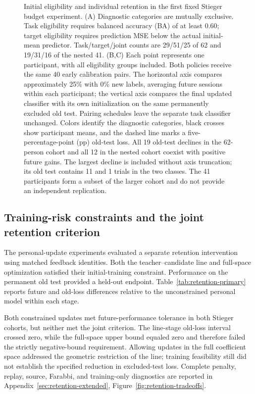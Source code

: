 \documentclass[11pt,a4paper]{article}
\begin{document}
\begin{figure}[t]
\begin{tikzpicture}[font=\scriptsize]
\end{tikzpicture}
\endgroup
\caption{Initial eligibility and individual retention in the first fixed Stieger budget experiment. (A) Diagnostic categories are mutually exclusive. Task eligibility requires balanced accuracy (BA) of at least 0.60; target eligibility requires prediction MSE below the actual initial-mean predictor. Task/target/joint counts are 29/51/25 of 62 and 19/31/16 of the nested 41. (B,C) Each point represents one participant, with all eligibility groups included. Both policies receive the same 40 early calibration pairs. The horizontal axis compares approximately 25\% with 0\% new labels, averaging future sessions within each participant; the vertical axis compares the final updated classifier with its own initialization on the same permanently excluded old test. Pairing schedules leave the separate task classifier unchanged. Colors identify the diagnostic categories, black crosses show participant means, and the dashed line marks a five-percentage-point (pp) old-test loss. All 19 old-test declines in the 62-person cohort and all 12 in the nested cohort coexist with positive future gains. The largest decline is included without axis truncation; its old test contains 11 and 1 trials in the two classes. The 41 participants form a subset of the larger cohort and do not provide an independent replication.}
\label{fig:retention-heterogeneity}
\end{figure}

\subsection{Training-risk constraints and the joint retention criterion}
\label{sec:retention-constraints}

The personal-update experiments evaluated a separate retention intervention using matched feedback identities. Both the teacher--candidate line and full-space optimization satisfied their initial-training constraint. Performance on the permanent old test provided a held-out endpoint. Table~\ref{tab:retention-primary} reports future and old-loss differences relative to the unconstrained personal model within each stage.

Both constrained updates met future-performance tolerance in both Stieger cohorts, but neither met the joint criterion. The line-stage old-loss interval crossed zero, while the full-space upper bound equaled zero and therefore failed the strictly negative-bound requirement. Allowing updates in the full coefficient space addressed the geometric restriction of the line; training feasibility still did not establish the specified reduction in excluded-test loss. Complete penalty, replay, source, Farabbi, and training-only diagnostics are reported in Appendix~\ref{sec:retention-extended}, Figure~\ref{fig:retention-tradeoffs}.
\end{document}

